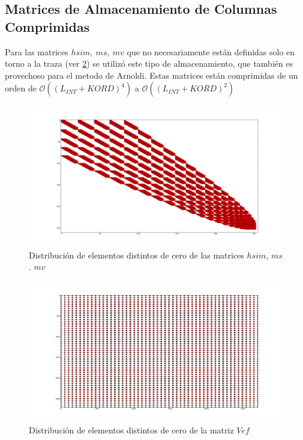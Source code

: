 \documentclass[a4paper,openright,12pt, oneside]{book}
\DeclareRobustCommand{\orderof}{\ensuremath{\mathcal{O}}}
\begin{document}
\subsection{Matrices de Almacenamiento de Columnas Comprimidas}
Para las matrices $hsim,\ ms,\ mv$ que no necesariamente est\'an definidas solo en torno a la traza (ver \ref{img:matstyle}) se utiliz\'o este tipo de almacenamiento, que tambi\'en es provechoso para el metodo de Arnoldi. Estas matrices est\'an comprimidas de un orden de $\orderof{(( L_{INT} + KORD)^4)}$ a $\orderof{(( L_{INT} + KORD)^2)}$

\begin{figure}[!htbp]
  \begin{center}
    \leavevmode

    \includegraphics[scale=0.3]{mat1.png}

    \caption{Distribuci\'on de elementos distintos de cero de las matrices $hsim$, $ms$. $mv$}
    \label{img:matstyle}
  \end{center}
\end{figure}

\begin{figure}[!htbp]
  \begin{center}
    \leavevmode

    \includegraphics[scale=0.3]{vef.png}

    \caption{Distribuci\'on de elementos distintos de cero de la matriz $Vef$}
    \label{img:matstyle}
  \end{center}
\end{figure}
\end{document}
